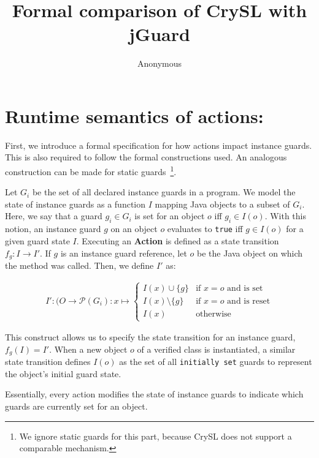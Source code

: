 \documentclass{article}
\title{Formal comparison of CrySL with jGuard}
\author{Anonymous}
\begin{document}
\maketitle



\label{runtimesemantics}
\section{Runtime semantics of actions: } First, we introduce a formal specification
for how actions impact instance guards. This is also required to follow the formal constructions used. An analogous construction can be made for static guards~\footnote{We ignore static guards for this part, because CrySL does not support a comparable mechanism.}.

Let $G_i$ be the set of all declared instance guards in a program. We model the state of instance guards as a function $I$ mapping Java objects to a subset of $G_i$.
Here, we say that a guard $g_i \in G_i$ is set for an object $o$ iff $ g_i \in I(o)$.
With this notion, an instance guard $g$ on an object $o$ evaluates to \texttt{true} iff $g \in I(o)$
for a given guard state $I$. Executing an \textbf{Action} is defined as a state transition $f_g: I \to I'$.
If $g$ is an instance guard reference, let $o$ be the Java object on which the
method was called. Then, we define $I'$ as:

\begin{align*}
  I': (O \to \mathcal{P}(G_i): x \mapsto \left\{ \begin{array}{cc}
    I(x) \cup \{ g \} & \text{if $x = o$ and is set} \\
    I(x) \setminus \{ g \} & \text{if $x = o$ and is reset} \\
    I(x) & \text{otherwise}
  \end{array}  \right.
\end{align*}

This construct allows us to specify the state transition for an instance guard,
$f_g(I) = I'$.
When a new object $o$ of a verified class is instantiated, a similar state transition defines
$I(o)$ as the set of all \texttt{initially set} guards to represent the object's initial guard
state.


Essentially, every action modifies the state of instance guards to indicate which guards are currently set for an object. \\
\end{document}
